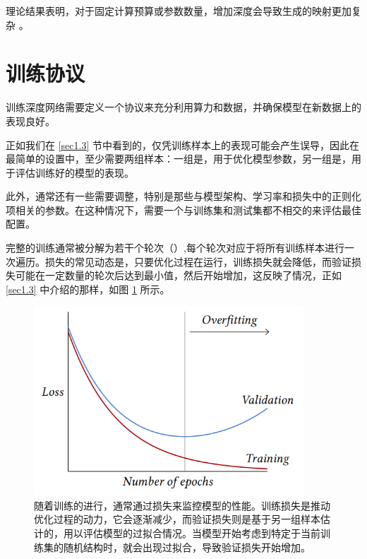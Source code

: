 理论结果表明，对于固定计算预算或参数数量，增加深度会导致生成的映射更加复杂 \citep{1602.04485}。

\section{训练协议}\label{sec3.7}

训练深度网络需要定义一个协议来充分利用算力和数据，并确保模型在新数据上的表现良好。

正如我们在 \ref{sec1.3} 节中看到的，仅凭训练样本上的表现可能会产生误导，因此在最简单的设置中，至少需要两组样本：一组是，用于优化模型参数，另一组是，用于评估训练好的模型的表现。

此外，通常还有一些需要调整，特别是那些与模型架构、学习率和损失中的正则化项相关的参数。在这种情况下，需要一个与训练集和测试集都不相交的来评估最佳配置。

完整的训练通常被分解为若干个轮次（）,每个轮次对应于将所有训练样本进行一次遍历。损失的常见动态是，只要优化过程在运行，训练损失就会降低，而验证损失可能在一定数量的轮次后达到最小值，然后开始增加，这反映了情况，正如 \ref{sec1.3} 中介绍的那样，如图 \ref{fig3.5} 所示。

\begin{figure}
    \centering
    \includegraphics[width=0.9\textwidth]{fig/fig3.5.png}
    \caption[训练损失和验证损失]{随着训练的进行，通常通过损失来监控模型的性能。训练损失是推动优化过程的动力，它会逐渐减少，而验证损失则是基于另一组样本估计的，用以评估模型的过拟合情况。当模型开始考虑到特定于当前训练集的随机结构时，就会出现过拟合，导致验证损失开始增加。}
    \label{fig3.5}
\end{figure}

